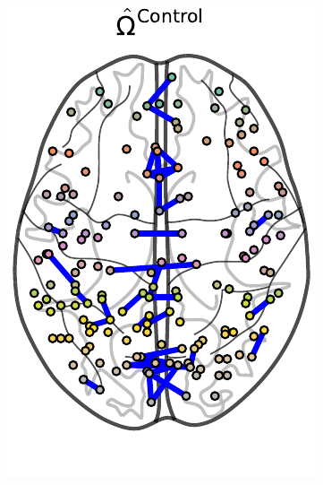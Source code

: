 \documentclass{article}
\begin{document}
\begin{figure}[H]
	\includegraphics[width=\columnwidth]{../../plots/connectomes/control.pdf}

\end{figure}
\end{document}
